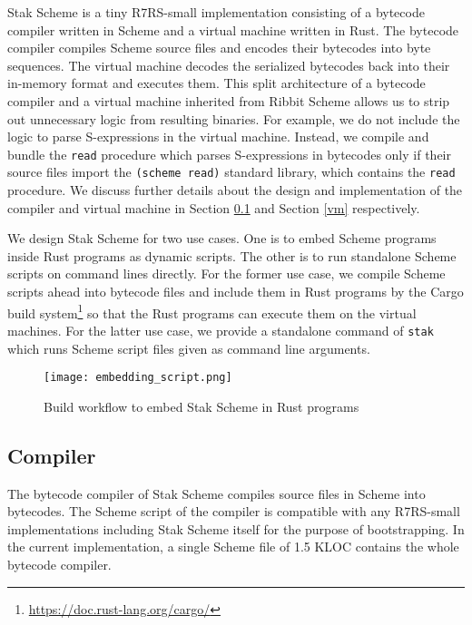 \documentclass[sigplan, anonymous, review]{acmart}
\begin{document}
Stak Scheme is a tiny R7RS-small implementation consisting of a
bytecode compiler written in Scheme and a virtual machine written in Rust.
The bytecode compiler compiles Scheme source files and encodes their bytecodes
into byte sequences.
The virtual machine decodes the serialized bytecodes back into their
in-memory format and executes them.
This split architecture of a bytecode compiler and a virtual machine inherited
from Ribbit Scheme allows us to strip
out unnecessary logic from resulting binaries.
For example, we do not include the logic to parse S-expressions
in the virtual machine.
Instead, we compile and bundle the \texttt{read} procedure which parses
S-expressions in bytecodes only if their source files import the
\texttt{(scheme read)} standard library, which contains the
\texttt{read} procedure.
We discuss further details about the design and implementation of the
compiler and virtual machine in Section \ref{compiler} and Section
\ref{vm} respectively.

We design Stak Scheme for two use cases. One is to embed Scheme
programs inside Rust programs as dynamic scripts.
The other is to run standalone Scheme scripts on command lines directly.
For the former use case, we
compile Scheme scripts ahead into bytecode files and include them in
Rust programs by the Cargo build
system\footnote{\url{https://doc.rust-lang.org/cargo/}} so that the
Rust programs can execute them on the virtual machines.
For the latter use case, we
provide a standalone command of \texttt{stak} which runs Scheme script
files given as command line arguments.

\begin{figure}
  \begin{center}
    \caption{Build workflow to embed Stak Scheme in Rust programs}
    \label{figure:build}
    \texttt{[image: embedding\_script.png]}
  \end{center}
\end{figure}

\subsection{Compiler} \label{compiler}

The bytecode compiler of Stak Scheme compiles source files in Scheme
into bytecodes.
The Scheme script of the compiler is compatible with any R7RS-small
implementations including Stak Scheme itself for the purpose of bootstrapping.
In the current implementation, a single Scheme file of 1.5 KLOC
contains the whole bytecode compiler.
\end{document}
